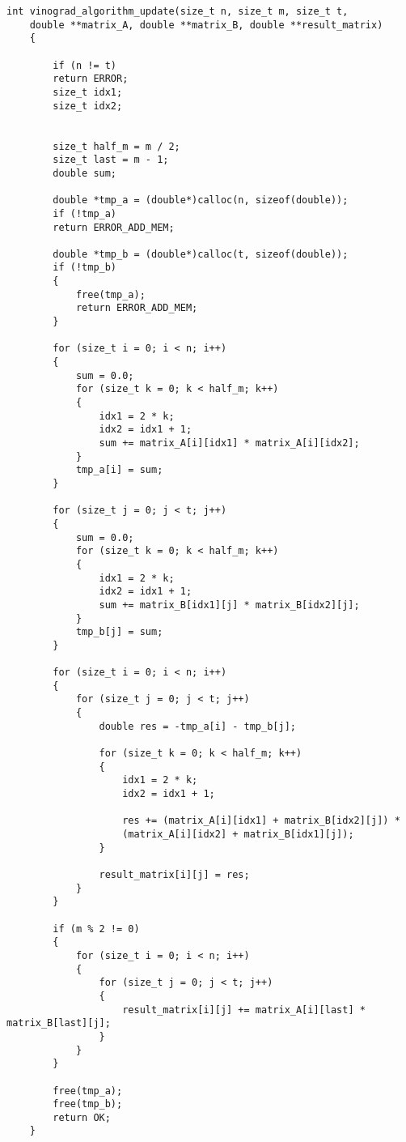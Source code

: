 \begin{lstlisting}[label=lst_vino_opt_algo, caption=Реализация оптимизированного алгоритма Винограда]
	int vinograd_algorithm_update(size_t n, size_t m, size_t t,
	double **matrix_A, double **matrix_B, double **result_matrix)
	{
		
		if (n != t)
		return ERROR;
		size_t idx1;
		size_t idx2;
		
		
		size_t half_m = m / 2;
		size_t last = m - 1;
		double sum;
		
		double *tmp_a = (double*)calloc(n, sizeof(double));
		if (!tmp_a)
		return ERROR_ADD_MEM;
		
		double *tmp_b = (double*)calloc(t, sizeof(double));
		if (!tmp_b)
		{
			free(tmp_a);
			return ERROR_ADD_MEM;
		}
		
		for (size_t i = 0; i < n; i++)
		{
			sum = 0.0;
			for (size_t k = 0; k < half_m; k++)
			{
				idx1 = 2 * k;
				idx2 = idx1 + 1;
				sum += matrix_A[i][idx1] * matrix_A[i][idx2];
			}
			tmp_a[i] = sum;
		}
		
		for (size_t j = 0; j < t; j++)
		{
			sum = 0.0;
			for (size_t k = 0; k < half_m; k++)
			{
				idx1 = 2 * k;
				idx2 = idx1 + 1;
				sum += matrix_B[idx1][j] * matrix_B[idx2][j];
			}
			tmp_b[j] = sum;
		}
		
		for (size_t i = 0; i < n; i++)
		{
			for (size_t j = 0; j < t; j++)
			{
				double res = -tmp_a[i] - tmp_b[j];
				
				for (size_t k = 0; k < half_m; k++)
				{
					idx1 = 2 * k;
					idx2 = idx1 + 1;
					
					res += (matrix_A[i][idx1] + matrix_B[idx2][j]) *
					(matrix_A[i][idx2] + matrix_B[idx1][j]);
				}
				
				result_matrix[i][j] = res;
			}
		}
		
		if (m % 2 != 0)
		{
			for (size_t i = 0; i < n; i++)
			{
				for (size_t j = 0; j < t; j++)
				{
					result_matrix[i][j] += matrix_A[i][last] * matrix_B[last][j];
				}
			}
		}
		
		free(tmp_a);
		free(tmp_b);
		return OK;
	}
\end{lstlisting}
